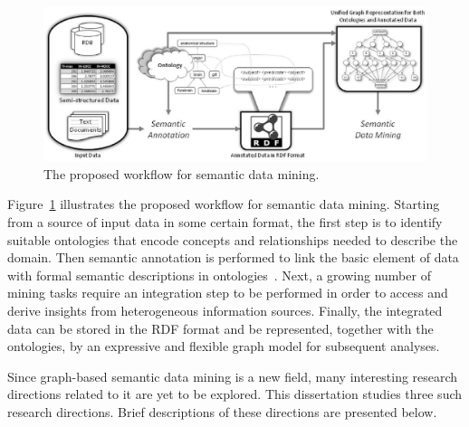 
\begin{figure}[tbh]
\begin{center}
\includegraphics[width=\textwidth, trim=0 7cm 0 6cm, clip=true]{fig/thesis-semantic-annotation-workflow.eps}
\end{center}
\caption[Semantic annotation in the workflow of semantic data mining.]{\label{fig:annotation-workflow} The proposed workflow for semantic data mining.}
\end{figure}

Figure~\ref{fig:annotation-workflow} illustrates the proposed workflow for semantic data mining. Starting from a source of input data in some certain format, the first step is to identify suitable ontologies that encode concepts and relationships needed to describe the domain. Then semantic annotation is performed to link the basic element of data with formal semantic descriptions in ontologies~\cite{KiryakovEtal04}. Next, a growing number of mining tasks require an integration step to be performed in order to access and derive insights from heterogeneous information sources. Finally, the integrated data can be stored in the RDF format and be represented, together with the ontologies, by an expressive and flexible graph model for subsequent analyses.

Since graph-based semantic data mining is a new field, many interesting research directions related to it are yet to be explored. This dissertation studies three such research directions. Brief descriptions of these directions are presented below.

